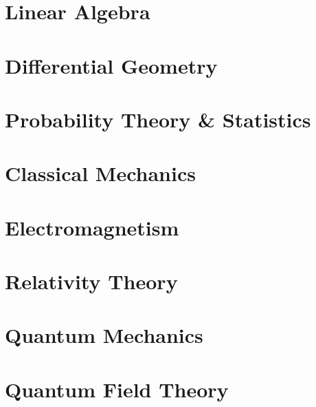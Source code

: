 \documentclass[11pt, a4paper]{report}
\begin{document}
\part{Linear Algebra}







\part{Differential Geometry}\label{part:diffgeom}















\part{Probability Theory \& Statistics}


%

\part{Classical Mechanics}







\part{Electromagnetism}




\part{Relativity Theory}


\part{Quantum Mechanics}









\part{Quantum Field Theory}


%

\end{document}
